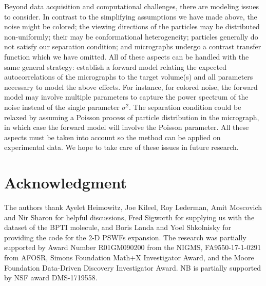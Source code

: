 \documentclass[9pt,twocolumn,twoside,lineno]{pnas-new}
\begin{document}
Beyond data acquisition and computational challenges, there are modeling issues to consider.
In contrast to the simplifying assumptions we have made above, the noise might be colored; the viewing directions of the particles may be distributed non-uniformly; their may be conformational heterogeneity; particles generally do not satisfy our separation condition; and micrographs undergo a contrast transfer function which we have omitted. All of these aspects can be handled with the same general strategy: establish a forward model relating the expected autocorrelations of the micrographs to the target volume(s) and all parameters necessary to model the above effects. For instance, for colored noise, the forward model may involve multiple parameters to capture the power spectrum of the noise instead of the single parameter $\sigma^2$. The separation condition could be relaxed by assuming a Poisson process of particle distribution in the micrograph, in which case the forward model will involve the Poisson parameter.
%
All these aspects must be taken into account so the method can be applied on experimental data. We hope to take care of these issues in future research. 



\section*{Acknowledgment}
The authors  thank Ayelet Heimowitz, Joe Kileel,  Roy Lederman, Amit Moscovich and Nir Sharon for helpful discussions, Fred Sigworth for supplying us with the dataset of the BPTI molecule,  and Boris Landa and Yoel Shkolnisky for providing the code for the 2-D PSWFs expansion.
The research was partially supported by Award Number R01GM090200 from the NIGMS, FA9550-17-1-0291 from AFOSR, Simons Foundation Math+X Investigator Award, and the Moore Foundation Data-Driven Discovery Investigator Award.
 NB is partially supported by NSF award DMS-1719558.
\end{document}
